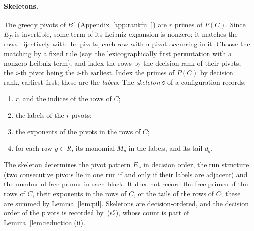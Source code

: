 \paragraph{Skeletons.}
The greedy pivots of $B'$ (Appendix~\ref{app:rankfull}) are $r$ primes of $P(C)$. Since $E_P$ is invertible, some term
of its Leibniz expansion is nonzero; it matches the rows bijectively with the pivots, each row with a pivot occurring in
it. Choose the matching by a fixed rule (say, the lexicographically first permutation with a nonzero Leibniz term), and
index the rows by the decision rank of their pivots, the $i$-th pivot being the $i$-th earliest. Index the primes of $P(C)$ by decision rank, earliest first; these are the \emph{labels}. The \emph{skeleton}
$\mathfrak s$ of a configuration records:
\begin{enumerate}[label=\textup{(s\arabic*)}]
\item $r$, and the indices of the rows of $C$;
\item the labels of the $r$ pivots;
\item the exponents of the pivots in the rows of $C$;
\item for each row $y\in R$, its monomial $M_y$ in the labels, and its tail $d_y$.
\end{enumerate}
The skeleton determines the pivot pattern $E_P$ in decision order, the run structure (two consecutive pivots lie in one
run if and only if their labels are adjacent) and the number of free primes in each block. It does not record the free
primes of the rows of $C$, their exponents in the rows of $C$, or the tails of the rows of $C$; these are summed by
Lemma~\ref{lem:pil}. Skeletons are decision-ordered, and the decision order of the pivots is recorded by~(s2), whose
count is part of Lemma~\ref{lem:reduction}(ii).

